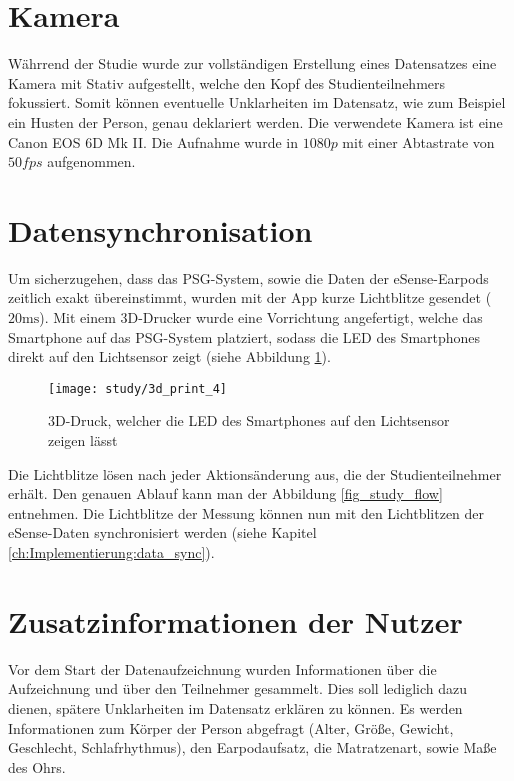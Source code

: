 \section{Kamera}
\label{ch:sa:camera}
Währrend der Studie wurde zur vollständigen Erstellung eines Datensatzes eine Kamera mit Stativ aufgestellt, welche den Kopf des Studienteilnehmers fokussiert. 
Somit können eventuelle Unklarheiten im Datensatz, wie zum Beispiel ein Husten der Person, genau deklariert werden. 
Die verwendete Kamera ist eine \glqq Canon EOS 6D Mk II\grqq.
Die Aufnahme wurde in $1080p$ mit einer Abtastrate von $50fps$ aufgenommen.

\section{Datensynchronisation}
\label{ch:sa:data_synchronisation}
Um sicherzugehen, dass das PSG-System, sowie die Daten der eSense-Earpods zeitlich exakt übereinstimmt, wurden mit der App kurze Lichtblitze gesendet ($20 \si{\ms}$).
Mit einem 3D-Drucker wurde eine Vorrichtung angefertigt, welche das Smartphone auf das PSG-System platziert, sodass die LED des Smartphones direkt auf den Lichtsensor zeigt (siehe Abbildung \ref{study:3d_print}).

\begin{figure}[ht]
    \centering
    \texttt{[image: study/3d\_print\_4]}
    \caption{3D-Druck, welcher die LED des Smartphones auf den Lichtsensor zeigen lässt}
    \label{study:3d_print}
  \end{figure}

Die Lichtblitze lösen nach jeder Aktionsänderung aus, die der Studienteilnehmer erhält. 
Den genauen Ablauf kann man der Abbildung \ref{fig_study_flow} entnehmen.
Die Lichtblitze der Messung können nun mit den Lichtblitzen der eSense-Daten synchronisiert werden (siehe Kapitel \ref{ch:Implementierung:data_sync}).

\section{Zusatzinformationen der Nutzer}
\label{ch:sa:additionalUserStudiesInformation}
Vor dem Start der Datenaufzeichnung wurden Informationen über die Aufzeichnung und über den Teilnehmer gesammelt. 
Dies soll lediglich dazu dienen, spätere Unklarheiten im Datensatz erklären zu können.
Es werden Informationen zum Körper der Person abgefragt (Alter, Größe, Gewicht, Geschlecht, Schlafrhythmus), den Earpodaufsatz, die Matratzenart, sowie Maße des Ohrs.

